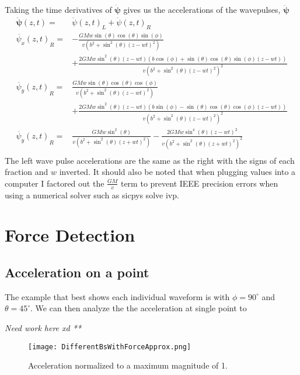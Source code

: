 \documentclass{report}
\begin{document}
Taking the time derivatives of $\mathbf{\dot{\psi}}$ gives us the accelerations of the wavepulses, $\mathbf{\ddot \psi}$
\begin{align}
    \mathbf{\ddot\psi} (z, t) =& {\ddot{\psi} (z, t)}_L + {\ddot{\psi} (z, t)}_R\label{acceleration_pulse}\\
    \nonumber {\ddot{\psi_x} (z, t)}_R =& -\frac{G M w \sin (\theta ) \cos (\theta ) \sin (\phi )}{v \left(b^2+\sin ^2(\theta ) {(z - w t)}^2\right) }\\
    & +\frac{2 G M w \sin ^2(\theta ) (z - w t) (b \cos (\phi )+\sin (\theta ) \cos (\theta ) \sin (\phi ) (z - w t))}{v {\left(b^2+\sin ^2(\theta ) {(z - w t)}^2\right)}^2}\\
    \nonumber {\ddot{\psi_y} (z, t)}_R =& \frac{G M w \sin (\theta ) \cos (\theta ) \cos (\phi )}{v \left(b^2+\sin ^2(\theta ) {(z - w t)}^2\right)}\\
    & +\frac{2 G M w \sin ^2(\theta ) (z - w t) (b \sin (\phi )-\sin (\theta ) \cos (\theta ) \cos (\phi ) (z - w t))}{v {\left(b^2+\sin ^2(\theta ) {(z - w t)}^2\right)}^2} \\
    \nonumber {\ddot{\psi_y} (z, t)}_R =& \frac{G M w \sin ^2(\theta )}{v \left(b^2+\sin ^2(\theta ) {(z + w t)}^2\right)} - \frac{2 G M w \sin ^4(\theta ) {(z - w t)}^2}{v {\left(b^2+\sin ^2(\theta ) {(z + w t)}^2\right)}^2}\\
\end{align} 
The left wave pulse accelerations are the same as the right with the signs of each fraction and $w$ inverted. 
It should also be noted that when plugging values into a computer I factored out the $\frac{G M}{v}$ term to prevent IEEE precision errors when using a numerical solver such as sicpys solve ivp.
\chapter*{Force Detection}
\section*{Acceleration on a point}
The example that best shows each individual waveform is with $\phi = 90^\circ$ and $\theta = 45^\circ$. We can then analyze the the acceleration at single point to 

\emph{Need work here xd **}

\begin{figure}[H]
    \texttt{[image: DifferentBsWithForceApprox.png]}
    \caption{Acceleration normalized to a maximum magnitude of 1.}\label{fig:normAcc}
\end{figure}
\end{document}
